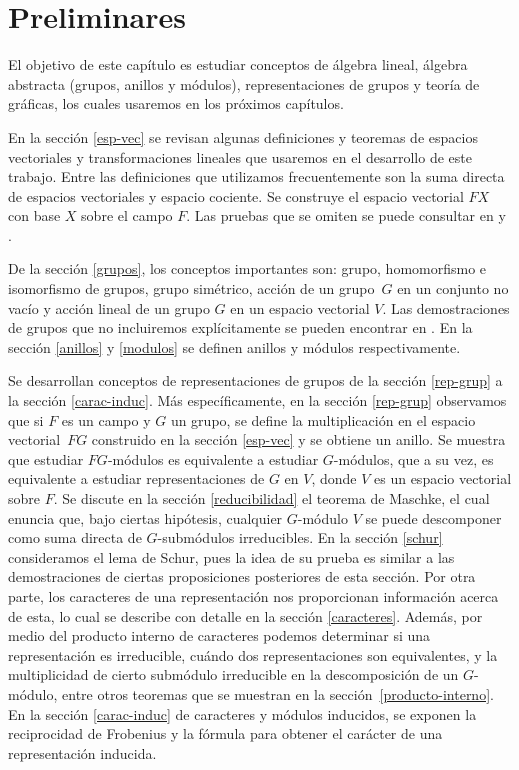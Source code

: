 \documentclass[12pt]{book}
\theoremstyle{definition}
\newcounter{in}
\newcounter{ini}
\begin{document}
\chapter{Preliminares}
\label{preliminares}

El objetivo de este capítulo es estudiar conceptos de álgebra
lineal, álgebra abstracta (grupos, anillos y módulos), representaciones
de grupos y teoría de gráficas, los cuales usaremos en los próximos capítulos. 

En la sección \ref{esp-vec} se revisan algunas definiciones y teoremas
de espacios vectoriales y transformaciones lineales que usaremos en el
desarrollo de este trabajo. Entre las definiciones que utilizamos
frecuentemente son la suma directa de espacios vectoriales y espacio
cociente. Se construye el espacio vectorial $FX$ con base $X$ sobre el
campo $F$. Las pruebas que se
omiten se puede consultar en \cite{friedberg1982algebra} y
\cite{herstein1990algebra}. 

De la sección \ref{grupos}, los conceptos importantes son: grupo, homomorfismo e isomorfismo de grupos, grupo
simétrico, acción de un grupo~$G$ en un conjunto no vacío y acción lineal
de un grupo $G$ en un espacio vectorial $V$. Las demostraciones de
grupos que no incluiremos explícitamente se pueden encontrar en
\cite{fraleigh}. En la sección \ref{anillos} y \ref{modulos} se
definen anillos y módulos respectivamente.

Se desarrollan conceptos de representaciones de grupos de la sección
\ref{rep-grup} a la sección \ref{carac-induc}. Más específicamente, en
la sección \ref{rep-grup} observamos que si $F$ es un campo y $G$ un
grupo, se define la multiplicación en el espacio vectorial~$FG$
construido en la sección \ref{esp-vec} y se obtiene un anillo. Se
muestra que estudiar
$FG$-módulos es equivalente a estudiar $G$-módulos, que a su vez, es
equivalente a estudiar representaciones de $G$ en $V$, donde $V$ es un
espacio vectorial sobre $F$. Se discute en la sección
\ref{reducibilidad} el teorema de Maschke, el cual
enuncia que, bajo ciertas hipótesis, cualquier $G$-módulo $V$ se puede descomponer como suma
directa de $G$-submódulos irreducibles. En la sección \ref{schur}
consideramos el lema de Schur, pues la idea de su prueba es similar a
las demostraciones de ciertas proposiciones posteriores de esta sección. Por otra parte, los caracteres de
una representación nos proporcionan información acerca de esta, lo
cual se describe con detalle en la sección \ref{caracteres}. Además,
por medio del producto interno de caracteres podemos determinar si una
representación es irreducible, cuándo dos representaciones son
equivalentes, y la multiplicidad de cierto submódulo irreducible en la
descomposición de un $G$-módulo, entre otros teoremas que se muestran en la
sección~\ref{producto-interno}. En la sección \ref{carac-induc} de
caracteres y módulos inducidos, se exponen la reciprocidad de
Frobenius y la fórmula para obtener el carácter de una representación
inducida.
\end{document}
